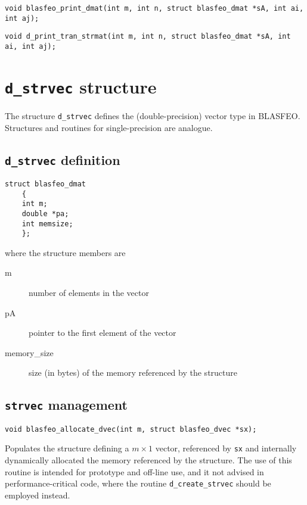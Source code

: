 \documentclass[a4paper]{report}
\begin{document}
\begin{verbatim}
void blasfeo_print_dmat(int m, int n, struct blasfeo_dmat *sA, int ai, int aj);
\end{verbatim}

\begin{verbatim}
void d_print_tran_strmat(int m, int n, struct blasfeo_dmat *sA, int ai, int aj);
\end{verbatim}



\section{{\tt d\_strvec} structure}

The structure {\tt d\_strvec} defines the (double-precision) vector type in BLASFEO.
Structures and routines for single-precision are analogue.



\subsection{{\tt d\_strvec} definition}

\begin{verbatim}
struct blasfeo_dmat 
    {
    int m;
    double *pa;
    int memsize;
    };
\end{verbatim}
where the structure members are
\begin{description}
\item[m] number of elements in the vector
\item[pA] pointer to the first element of the vector
\item[memory\_size] size (in bytes) of the memory referenced by the structure
\end{description}



\subsection{{\tt strvec} management}

\begin{verbatim}
void blasfeo_allocate_dvec(int m, struct blasfeo_dvec *sx);
\end{verbatim}
Populates the structure defining a $m\times 1$ vector, referenced by {\tt sx} and internally dynamically allocated the memory referenced by the structure.
The use of this routine is intended for prototype and off-line use, and it not advised in performance-critical code, where the routine {\tt d\_create\_strvec} should be employed instead.
\end{document}
